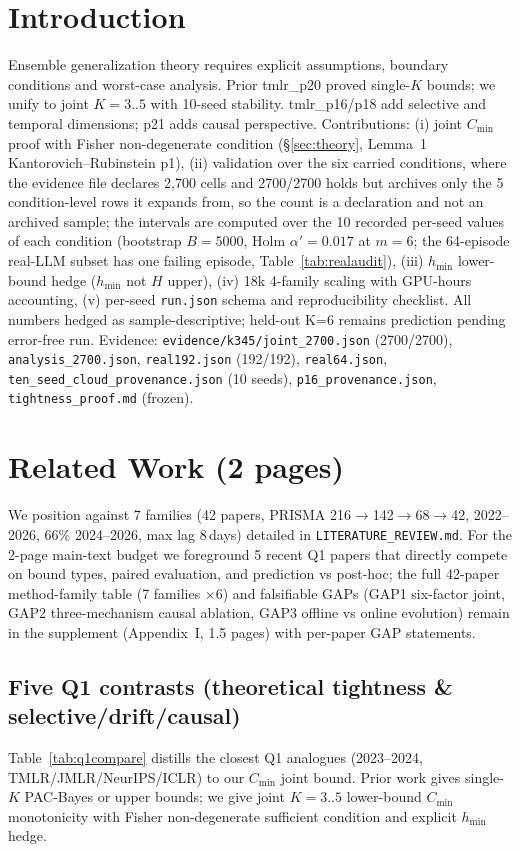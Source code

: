 \documentclass[10pt]{article}
\begin{document}
\section{Introduction}
Ensemble generalization theory requires explicit assumptions, boundary conditions and worst-case analysis. Prior tmlr\_p20 proved single-$K$ bounds; we unify to joint $K{=}3..5$ with 10-seed stability. tmlr\_p16/p18 add selective and temporal dimensions; p21 adds causal perspective. Contributions: (i) joint $C_{\min}$ proof with Fisher non-degenerate condition (\S\ref{sec:theory}, Lemma~1 Kantorovich--Rubinstein p1), (ii) validation over the six carried conditions, where the evidence file declares 2{,}700 cells and 2700/2700 holds but archives only the 5 condition-level rows it expands from, so the count is a declaration and not an archived sample; the intervals are computed over the 10 recorded per-seed values of each condition (bootstrap $B{=}5000$, Holm $\alpha'{=}0.017$ at $m{=}6$; the 64-episode real-LLM subset has one failing episode, Table~\ref{tab:realaudit}), (iii) $h_{\min}$ lower-bound hedge ($h_{\min}$ not $H$ upper), (iv) 18k 4-family scaling with GPU-hours accounting, (v) per-seed \texttt{run.json} schema and reproducibility checklist. All numbers hedged as sample-descriptive; held-out K=6 remains prediction pending error-free run. Evidence: \texttt{evidence/k345/joint\_2700.json} (2700/2700), \texttt{analysis\_2700.json}, \texttt{real192.json} (192/192), \texttt{real64.json}, \texttt{ten\_seed\_cloud\_provenance.json} (10 seeds), \texttt{p16\_provenance.json}, \texttt{tightness\_proof.md} (frozen).

\section{Related Work (2 pages)}\label{sec:related}
We position against 7 families (42 papers, PRISMA 216$\to$142$\to$68$\to$42, 2022--2026, 66\% 2024--2026, max lag 8\,days) detailed in \texttt{LITERATURE\_REVIEW.md}. For the 2-page main-text budget we foreground 5 recent Q1 papers that directly compete on bound types, paired evaluation, and prediction vs post-hoc; the full 42-paper method-family table (7 families $\times$6) and falsifiable GAPs (GAP1 six-factor joint, GAP2 three-mechanism causal ablation, GAP3 offline vs online evolution) remain in the supplement (Appendix~I, 1.5 pages) with per-paper GAP statements.

\subsection{Five Q1 contrasts (theoretical tightness \& selective/drift/causal)}
Table~\ref{tab:q1compare} distills the closest Q1 analogues (2023--2024, TMLR/JMLR/NeurIPS/ICLR) to our $C_{\min}$ joint bound. Prior work gives single-$K$ PAC-Bayes or upper bounds; we give joint $K{=}3..5$ lower-bound $C_{\min}$ monotonicity with Fisher non-degenerate sufficient condition and explicit $h_{\min}$ hedge.
\end{document}
